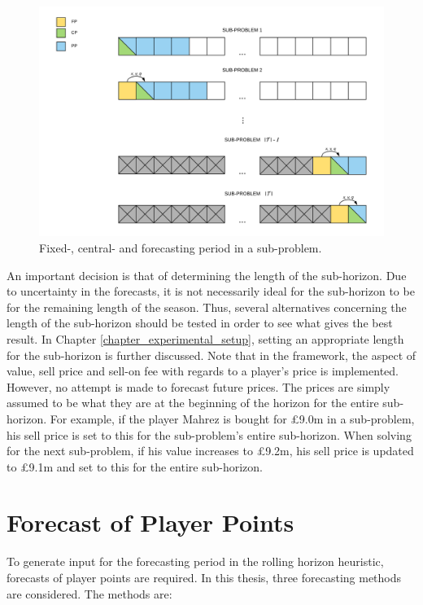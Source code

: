 \begin{figure}[H]
    \centering
    \includegraphics[scale = 0.47]{fig/chapter_5/rolling_horizon.png}
    \caption{Fixed-, central- and forecasting period in a sub-problem.}
    \label{fig:rolling_horizon}
\end{figure}

\newpar

An important decision is that of determining the length of the sub-horizon. Due to uncertainty in the forecasts, it is not necessarily ideal for the sub-horizon to be for the remaining length of the season. Thus, several alternatives concerning the length of the sub-horizon should be tested in order to see what gives the best result. In Chapter \ref{chapter_experimental_setup}, setting an appropriate length for the sub-horizon is further discussed. Note that in the framework, the aspect of value, sell price and sell-on fee with regards to a player's price is implemented. However, no attempt is made to forecast future prices. The prices are simply assumed to be what they are at the beginning of the horizon for the entire sub-horizon. For example, if the player Mahrez is bought for \pounds 9.0m in a sub-problem, his sell price is set to this for the sub-problem's entire sub-horizon. When solving for the next sub-problem, if his value increases to \pounds 9.2m, his sell price is updated to \pounds 9.1m and set to this for the entire sub-horizon. 

\section{Forecast of Player Points} \label{Player_Performance}

To generate input for the forecasting period in the rolling horizon heuristic, forecasts of player points are required. In this thesis, three forecasting methods are considered. The methods are: 

